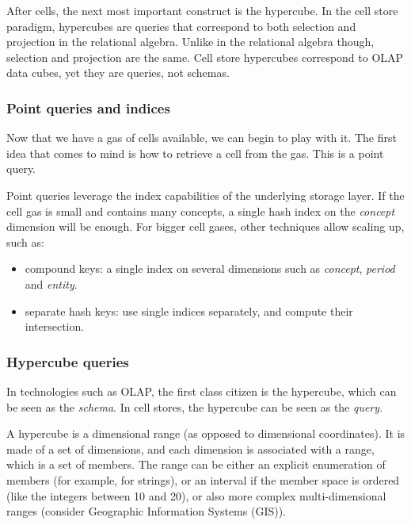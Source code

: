\documentclass{acm_proc_article-sp}
\begin{document}
After cells, the next most important construct is the hypercube. In the cell store paradigm, hypercubes are queries that correspond to both selection and projection in the relational algebra. Unlike in the relational algebra though, selection and projection are the same. Cell store hypercubes correspond to OLAP data cubes, yet they are queries, not schemas.

\subsubsection{Point queries and indices}

Now that we have a gas of cells available, we can begin to play with it. The first idea that comes to mind is how to retrieve a cell from the gas. This is a point query.

Point queries leverage the index capabilities of the underlying storage layer. If the cell gas is small and contains many concepts, a single hash index on the \emph{concept} dimension will be enough. For bigger cell gases, other techniques allow scaling up, such as:
\begin{itemize}
\item compound keys: a single index on several dimensions such as \emph{concept}, \emph{period} and \emph{entity}.
\item separate hash keys: use single indices separately, and compute their intersection.
\end{itemize}

\subsubsection{Hypercube queries}
In technologies such as OLAP, the first class citizen is the hypercube, which can be seen as the \emph{schema}. In cell stores, the hypercube can be seen as the \emph{query}.

A hypercube is a dimensional range (as opposed to dimensional coordinates). It is made of a set of dimensions, and each dimension is associated with a range, which is a set of members. The range can be either an explicit enumeration of members (for example, for strings), or an interval if the member space is ordered (like the integers between 10 and 20), or also more complex multi-dimensional ranges (consider Geographic Information Systems (GIS)).
\end{document}
